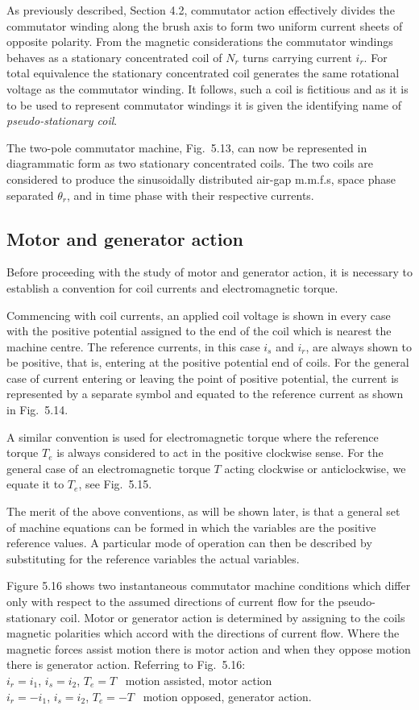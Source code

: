 \documentclass[a4paper,numbers=noenddot,12pt]{scrbook}
\begin{document}
As previously described, Section 4.2, commutator action effectively divides the commutator winding along the brush axis to form two uniform current sheets of opposite polarity. From the magnetic considerations the commutator windings behaves as a stationary concentrated coil of $N_r$ turns carrying current $i_r$. For total equivalence the stationary concentrated coil generates the same rotational voltage as the commutator winding. It follows, such a coil is fictitious and as it is to be used to represent commutator  windings it is given the identifying name of \emph{pseudo-stationary coil}.

The two-pole commutator machine, Fig.\ 5.13, can now be represented in diagrammatic form as two stationary concentrated coils. The two coils are considered to produce the sinusoidally distributed air-gap m.m.f.s, space phase separated $\theta_r$, and in time phase with their respective currents.

\subsection{Motor and generator action}
Before proceeding with the study of motor and generator action, it is necessary to establish a convention for coil currents and electromagnetic torque.

Commencing with coil currents, an applied coil voltage is shown in every case with the positive potential assigned to the end of the coil which is nearest the machine centre. The reference currents, in this case $i_s$ and $i_r$, are always shown to be positive, that is, entering at the positive potential end of coils. For the general case of current entering or leaving the point of positive potential, the current is represented by a separate symbol and equated to the reference current as shown in Fig.\ 5.14.

A similar convention is used for electromagnetic torque where the reference torque $T_e$ is always considered to act in the positive clockwise sense. For the general case of an electromagnetic torque $T$ acting clockwise or anticlockwise, we equate it to $T_e$, see Fig.\ 5.15.

The merit of the above conventions, as will be shown later, is that a general set of machine equations can be formed in which the variables are the positive reference values. A particular mode of operation can then be described by substituting for the reference variables the actual variables.

Figure 5.16 shows two instantaneous commutator machine conditions which differ only with respect to the assumed directions of current flow for the pseudo-stationary coil. Motor or generator action is determined by assigning to the coils magnetic polarities which accord with the directions of current flow. Where the magnetic forces assist motion there is motor action and when they oppose motion there is generator action. Referring to Fig.\ 5.16:\\
\TabPositions{0cm,2cm,4cm,6cm}
$i_r = i_1$, \tab$i_s = i_2$, \tab$T_e = T$ \tab\ motion assisted, motor action \\
$i_r = - i_1$, \tab$i_s = i_2$, \tab$T_e = - T$ \tab\ motion opposed, generator action.
\end{document}
